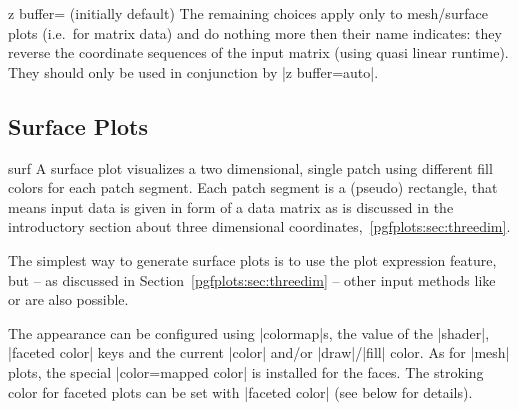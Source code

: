 {\begin{pgfplotskey}{z buffer= (initially default)}
	The remaining choices apply only to mesh/surface plots (i.e.\ for matrix data) and do nothing more then their name indicates: they reverse the coordinate sequences of the input matrix (using quasi linear runtime). They should only be used in conjunction by |z buffer=auto|.
\end{pgfplotskey}

\subsection{Surface Plots}
\label{sec:pgfplots:surfplots}
\begin{plottype}[/pgfplots]{surf}
	A surface plot visualizes a two dimensional, single patch using different fill colors for each patch segment. Each patch segment is a (pseudo) rectangle, that means input data is given in form of a data matrix as is discussed in the introductory section about three dimensional coordinates,~\ref{pgfplots:sec:threedim}.

\pgfplotsexpensiveexample
\begin{codeexample}[]
\end{codeexample}

	The simplest way to generate surface plots is to use the plot expression feature, but -- as discussed in Section~\ref{pgfplots:sec:threedim} -- other input methods like  or  are also possible. 

	The appearance can be configured using |colormap|s, the value of the |shader|, |faceted color| keys and the current |color| and/or |draw|/|fill| color. As for |mesh| plots, the special |color=mapped color| is installed for the faces. The stroking color for faceted plots can be set with |faceted color| (see below for details).

\pgfplotsexpensiveexample
\begin{codeexample}[]
\end{codeexample}


\end{plottype}}
